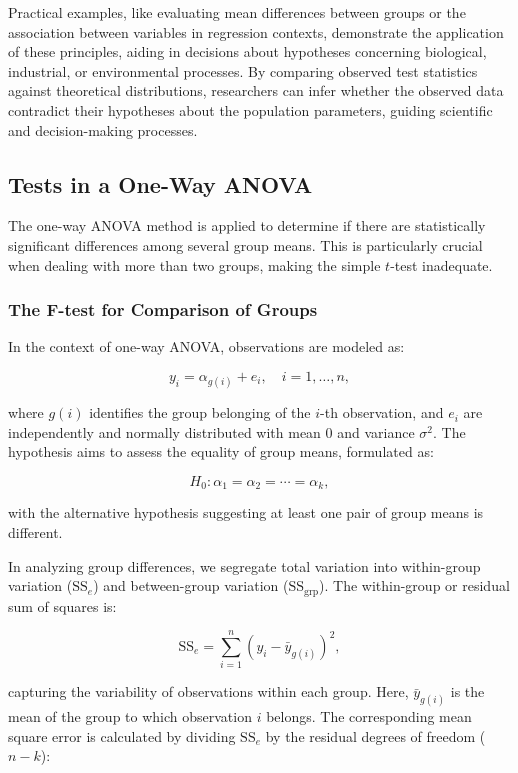 \documentclass{article}
\begin{document}
Practical examples, like evaluating mean differences between groups or the association between variables in regression contexts, demonstrate the application of these principles, aiding in decisions about hypotheses concerning biological, industrial, or environmental processes. By comparing observed test statistics against theoretical distributions, researchers can infer whether the observed data contradict their hypotheses about the population parameters, guiding scientific and decision-making processes.

\subsection{Tests in a One-Way ANOVA}

The one-way ANOVA method is applied to determine if there are statistically significant differences among several group means. This is particularly crucial when dealing with more than two groups, making the simple $t$-test inadequate.

\subsubsection{The F-test for Comparison of Groups}

In the context of one-way ANOVA, observations are modeled as:

\[
y_{i} = \alpha_{g(i)} + e_{i}, \quad i = 1, \ldots, n,
\]

where $g(i)$ identifies the group belonging of the $i$-th observation, and $e_i$ are independently and normally distributed with mean 0 and variance $\sigma^2$. The hypothesis aims to assess the equality of group means, formulated as:

\[
H_0: \alpha_{1} = \alpha_{2} = \cdots = \alpha_{k},
\]

with the alternative hypothesis suggesting at least one pair of group means is different.

In analyzing group differences, we segregate total variation into within-group variation ($\text{SS}_{e}$) and between-group variation ($\text{SS}_{\text{grp}}$). The within-group or residual sum of squares is:

\[
\text{SS}_{e} = \sum_{i=1}^{n} (y_i - \bar{y}_{g(i)})^2,
\]

capturing the variability of observations within each group. Here, $\bar{y}_{g(i)}$ is the mean of the group to which observation $i$ belongs. The corresponding mean square error is calculated by dividing $\text{SS}_{e}$ by the residual degrees of freedom ($n - k$):
\end{document}
